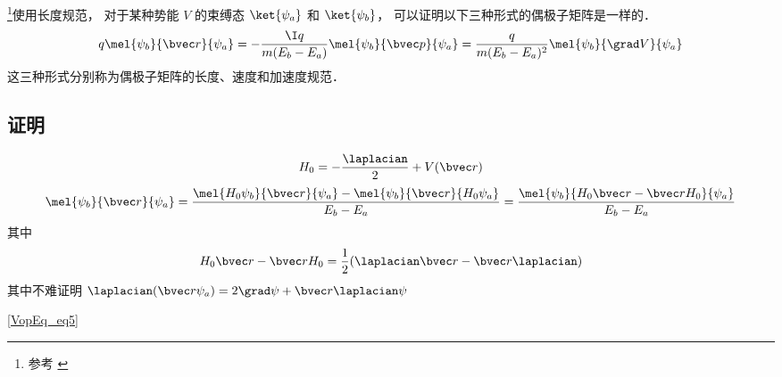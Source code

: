 

\footnote{参考 \cite{Brandsen}}使用长度规范， 对于某种势能 $V$ 的束缚态 $\ket{\psi_a}$ 和 $\ket{\psi_b}$， 可以证明以下三种形式的偶极子矩阵是一样的．
\begin{equation}
q\mel{\psi_b}{\bvec r}{\psi_a} = -\frac{\I q}{m(E_b - E_a)}\mel{\psi_b}{\bvec p}{\psi_a} = \frac{q}{m(E_b-E_a)^2} \mel{\psi_b}{\grad V}{\psi_a}
\end{equation}
这三种形式分别称为偶极子矩阵的长度、速度和加速度规范．

\subsection{证明}
\begin{equation}
H_0 = -\frac{\laplacian}{2} + V(\bvec r)
\end{equation}
\begin{equation}
\mel{\psi_b}{\bvec r}{\psi_a} = \frac{\mel{H_0\psi_b}{\bvec r}{\psi_a} - \mel{\psi_b}{\bvec r}{H_0\psi_a}}{E_b - E_a} = \frac{\mel{\psi_b}{H_0\bvec r - \bvec rH_0}{\psi_a}}{E_b - E_a}
\end{equation}
其中
\begin{equation}
H_0\bvec r - \bvec rH_0 = \frac{1}{2}(\laplacian \bvec r - \bvec r \laplacian)
\end{equation}
其中不难证明 $\laplacian (\bvec r \psi_a) = 2 \grad \psi + \bvec r \laplacian \psi$

\autoref{VopEq_eq5}~
